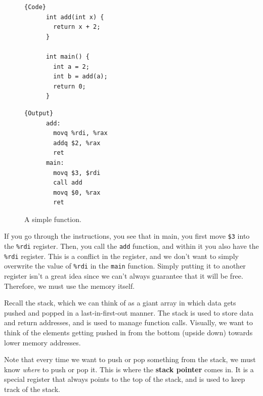   \begin{figure}[H]
    \centering 
    \noindent\begin{minipage}{.5\textwidth}
    \begin{lstlisting}[]{Code}
      int add(int x) {
        return x + 2; 
      }

      int main() {
        int a = 2; 
        int b = add(a); 
        return 0; 
      }
    \end{lstlisting}
    \end{minipage}
    \hfill
    \begin{minipage}{.49\textwidth}
    \begin{lstlisting}[]{Output}
      add: 
        movq %rdi, %rax 
        addq $2, %rax 
        ret 
      main:
        movq $3, $rdi 
        call add 
        movq $0, %rax 
        ret 
    \end{lstlisting}
    \end{minipage}
    \caption{A simple function. } 
    \label{fig:stack_example}
  \end{figure}

  If you go through the instructions, you see that in main, you first move \texttt{\$3} into the \texttt{\%rdi} register. Then, you call the \texttt{add} function, and within it you also have the \texttt{\%rdi} register. This is a conflict in the register, and we don't want to simply overwrite the value of \texttt{\%rdi} in the \texttt{main} function. Simply putting it to another register isn't a great idea since we can't always guarantee that it will be free. Therefore, we must use the memory itself. 

  Recall the stack, which we can think of as a giant array in which data gets pushed and popped in a last-in-first-out manner. The stack is used to store data and return addresses, and is used to manage function calls. Visually, we want to think of the elements getting pushed in from the bottom (upside down) towards lower memory addresses. 

  \begin{definition}
    Note that every time we want to push or pop something from the stack, we must know \textit{where} to push or pop it. This is where the \textbf{stack pointer} comes in. It is a special register that always points to the top of the stack, and is used to keep track of the stack.
  \end{definition}

